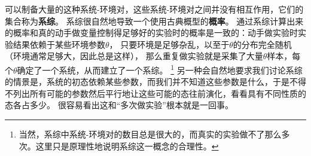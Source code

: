 \documentclass[hyperref, UTF8, a4paper]{ctexart}
\begin{document}
可以制备大量的这种系统-环境对，这些系统-环境对之间并没有相互作用，它们的集合称为\textbf{系综}。
系综很自然地导致一个使用古典概型的\textbf{概率}。
通过系综计算出来的概率和真的动手做变量控制得足够好的实验时的概率是一致的：动手做实验时实验结果依赖于某些环境参数$\theta$，
只要环境是足够杂乱，以至于$\theta$的分布完全随机（环境通常足够大，因此总是这样），
那么重复做实验就是采集了大量$\theta$样本，每个$\theta$确定了一个系统，从而建立了一个系综。%
\footnote{当然，系综中系统-环境对的数目总是很大的，而真实的实验做不了那么多次。这里只是原理性地说明系综这一概念的合理性。}%
另一种会自然地要求我们讨论系综的情景是，系统的初态依赖某些参数，而我们并不知道这些参数是什么，于是不得不列出所有可能的参数然后平行地让这些可能的态往前演化，看看具有不同性质的态各占多少。
很容易看出这和“多次做实验”根本就是一回事。
\end{document}
